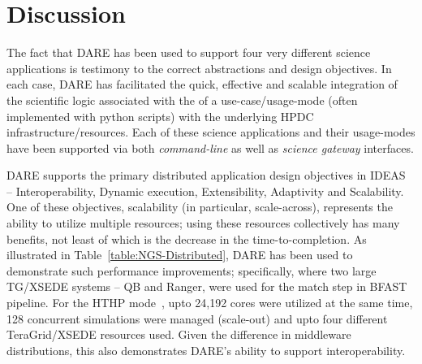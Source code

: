 \documentclass[]{svjour3}
\begin{document}
\section{Discussion}


The fact that DARE has been used to support four very different
science applications is testimony to the correct abstractions and
design objectives.  In each case, DARE has facilitated the quick,
effective and scalable integration of the scientific logic associated
with the of a use-case/usage-mode (often implemented with python
scripts) with the underlying HPDC infrastructure/resources.  Each of
these science applications and their usage-modes have been supported
via both {\it command-line} as well as {\it science gateway}
interfaces.


DARE supports the primary distributed application design objectives in
IDEAS~\cite{ideas} -- Interoperability, Dynamic execution,
Extensibility, Adaptivity and Scalability. One of these objectives,
scalability (in particular, scale-across), represents the ability to
utilize multiple resources; using these resources collectively has
many benefits, not least of which is the decrease in the
time-to-completion.  As illustrated in
Table~\ref{table:NGS-Distributed}, DARE has been used to demonstrate
such performance improvements; specifically, where two large TG/XSEDE
systems -- QB and Ranger, were used for the match step in BFAST
pipeline. For the HTHP mode~\cite{bigjob-ccgrid12}, upto 24,192 cores
were utilized at the same time, 128 concurrent simulations were
managed (scale-out) and upto four different TeraGrid/XSEDE resources
used. Given the difference in middleware distributions, this also
demonstrates DARE's ability to support interoperability.

\end{document}
